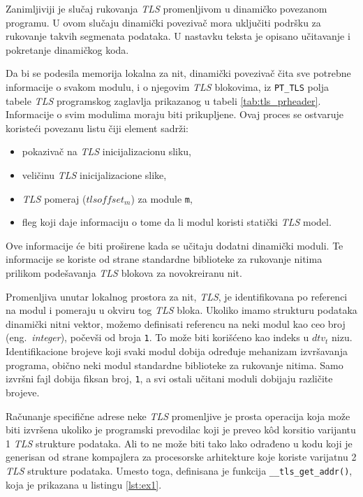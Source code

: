 \documentclass[12pt,oneside]{memoir}
\begin{document}
Zanimljiviji je slučaj rukovanja \emph{TLS} promenljivom u dinamičko povezanom programu. U ovom slučaju dinamički povezivač mora uključiti podršku za rukovanje takvih segmenata podataka. U nastavku teksta je opisano učitavanje i pokretanje dinamičkog koda.

Da bi se podesila memorija lokalna za nit, dinamički povezivač čita sve potrebne informacije o svakom modulu, i o njegovim \emph{TLS} blokovima, iz \texttt{PT\_TLS} polja tabele \emph{TLS} programskog zaglavlja prikazanog u tabeli \ref{tab:tls_prheader}. Informacije o svim modulima moraju biti prikupljene. Ovaj proces se ostvaruje koristeći povezanu listu čiji element sadrži:

\begin{itemize}
	\item pokazivač na \emph{TLS} inicijalizacionu sliku,
	\item veličinu \emph{TLS} inicijalizacione slike,
	\item \emph{TLS} pomeraj (\texttt{$tlsoffset_m$}) za module \texttt{m},
	\item fleg koji daje informaciju o tome da li modul koristi statički \emph{TLS} model.
\end{itemize}

Ove informacije će biti proširene kada se učitaju dodatni dinamički moduli. Te informacije se koriste od strane standardne biblioteke za rukovanje nitima prilikom podešavanja \emph{TLS} blokova za novokreiranu nit.

Promenljiva unutar lokalnog prostora za nit, \emph{TLS}, je identifikovana po referenci na modul i pomeraju u okviru tog \emph{TLS} bloka. Ukoliko imamo strukturu podataka dinamički nitni vektor, možemo definisati referencu na neki modul kao ceo broj (eng.~\emph{integer}), počevši od broja \texttt{1}. To može biti korišćeno kao indeks u \texttt{$dtv_t$} nizu. Identifikacione brojeve koji svaki modul dobija određuje mehanizam izvršavanja programa, obično neki modul standardne biblioteke za rukovanje nitima. Samo izvršni fajl dobija fiksan broj, \texttt{1}, a svi ostali učitani moduli dobijaju različite brojeve.

Računanje specifične adrese neke \emph{TLS} promenljive je prosta operacija koja može biti izvršena ukoliko je programski prevodilac koji je preveo k\^{o}d korsitio varijantu 1 \emph{TLS} strukture podataka. Ali to ne može biti tako lako odrađeno u kodu koji je generisan od strane kompajlera za procesorske arhitekture koje koriste varijatnu 2 \emph{TLS} strukture podataka.
Umesto toga, definisana je funkcija \texttt{\_\_tls\_get\_addr()}, koja je prikazana u listingu \ref{lst:ex1}.\newpage
\end{document}
